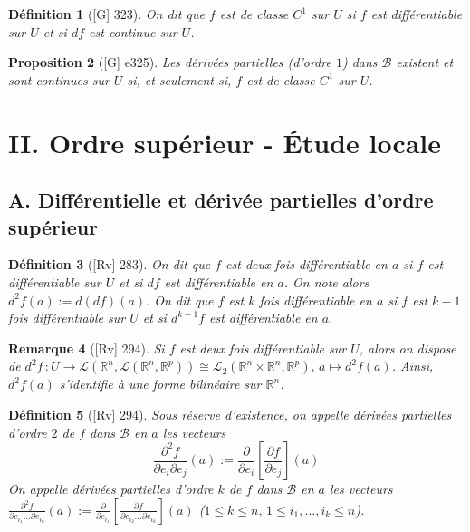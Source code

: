 \documentclass[10pt, a4paper, parskip=full, twoside, twocolumn]{report}
\newtheorem{definition}{Définition}
\newtheorem{proposition}[definition]{Proposition}
\newtheorem{remark}[definition]{Remarque}
\newcommand{\IR}{\mathbb{R}}
\newcommand{\B}{\mathcal{B}}
\begin{document}
\begin{definition}[\textnormal{[G] 323}]
	On dit que $f$ est \emph{de classe $C^1$ sur $U$} si $f$ est différentiable sur $U$ et si $df$ est continue sur $U$.
\end{definition}

\begin{proposition}[\textnormal{[G] e325}]
	Les dérivées partielles (d'ordre $1$) dans $\B$ existent et sont continues sur $U$ si, et seulement si, $f$ est de classe $C^1$ sur $U$.
\end{proposition}

\section*{II. Ordre supérieur - Étude locale}
\subsection*{A. Différentielle et dérivée partielles d'ordre supérieur}

\begin{definition}[\textnormal{[Rv] 283}]
	On dit que $f$ est \emph{deux fois différentiable en $a$} si $f$ est différentiable sur $U$ et si $df$ est différentiable en $a$.
	On note alors $d^2f(a) := d(df)(a)$. On dit que $f$ est \emph{$k$ fois différentiable en $a$} si $f$ est $k-1$ fois différentiable sur $U$ et si $d^{k-1}f$ est différentiable en $a$.
\end{definition}

\begin{remark}[\textnormal{[Rv] 294}]
	Si $f$ est deux fois différentiable sur $U$, alors on dispose de $d^2f\,\colon U\to \mathcal{L}(\IR^n, \mathcal{L}(\IR^n,\IR^p))\cong \mathcal{L}_2(\IR^n\times\IR^n,\IR^p),\, a\mapsto d^2f(a)$.
	Ainsi, $d^2f(a)$ s'identifie à une forme bilinéaire sur $\IR^n$.
\end{remark}

\begin{definition}[\textnormal{[Rv] 294}]
	Sous réserve d'existence, on appelle \emph{dérivées partielles d'ordre $2$ de $f$ dans $\B$ en $a$} les vecteurs
	$$\frac{\partial^2f}{\partial e_i \partial e_j}(a) := \frac{\partial}{\partial e_i}\left[\frac{\partial f}{\partial e_j}\right](a)$$
	On appelle \emph{dérivées partielles d'ordre $k$ de $f$ dans $\B$ en $a$} les vecteurs $\frac{\partial^2f}{\partial e_{i_1}\dots\partial e_{i_k}}(a) := \frac{\partial}{\partial e_{i_1}}\left[\frac{\partial f}{\partial e_{i_2}\dots\partial e_{i_k}}\right](a)$ ($1\leq k\leq n,\, 1\leq i_1,\dots, i_k\leq n$).
\end{definition}
\end{document}
